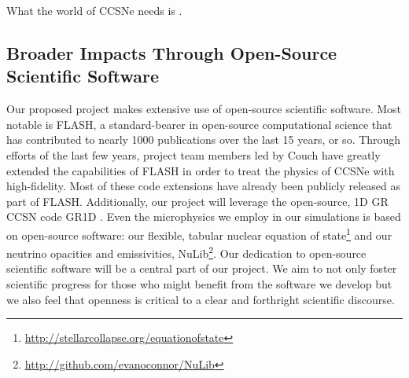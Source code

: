 What the world of CCSNe needs is .


\subsection{Broader Impacts Through Open-Source Scientific Software}

Our proposed project makes extensive use of open-source scientific software.
Most notable is FLASH, a standard-bearer in open-source computational science that has contributed to nearly 1000 publications over the last 15 years, or so.
Through efforts of the last few years, project team members led by Couch have greatly extended the capabilities of FLASH in order to treat the physics of CCSNe with high-fidelity.
Most of these code extensions have already been publicly released as part of FLASH.
Additionally, our project will leverage the open-source, 1D GR CCSN code GR1D \citep{OConnor:2010bi}.
Even the microphysics we employ in our simulations is based on open-source software: our flexible, tabular nuclear equation of state\footnote{\url{http://stellarcollapse.org/equationofstate}} and our neutrino opacities and emissivities, NuLib\footnote{\url{http://github.com/evanoconnor/NuLib}}.
Our dedication to open-source scientific software will be a central part of our project.
We aim to not only foster scientific progress for those who might benefit from the software we develop but we also feel that openness is critical to a clear and forthright scientific discourse.




